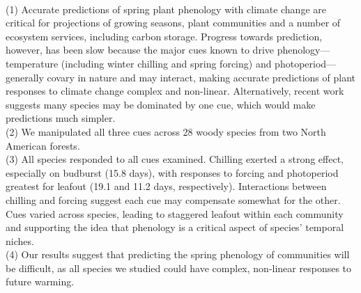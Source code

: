 \documentclass[11pt]{article}
\begin{document}
\newpage %
\\
(1) Accurate predictions of spring plant phenology with climate change are critical for projections of growing seasons, plant communities and a number of ecosystem services, including carbon storage. Progress towards prediction, however, has been slow because the major cues known to drive phenology---temperature (including  winter chilling and spring forcing) and photoperiod---generally covary in nature and may interact, making accurate predictions of plant responses to climate change complex and non-linear. Alternatively, recent work suggests many species may be dominated by one cue, which would make predictions much simpler. \\
(2) We manipulated all three cues across 28 woody species from two North American forests.\\
(3) All species responded to all cues examined. Chilling exerted a strong effect, especially on budburst (15.8 days), with responses to forcing and photoperiod greatest for leafout (19.1 and 11.2 days, respectively). Interactions between chilling and forcing suggest each cue may compensate somewhat for the other. Cues varied across species, leading to staggered leafout within each community and supporting the idea that phenology is a critical aspect of species' temporal niches. \\
(4) Our results suggest that predicting the spring phenology of communities will be difficult, as all species we studied could have complex, non-linear responses to future warming. 
\end{document}
